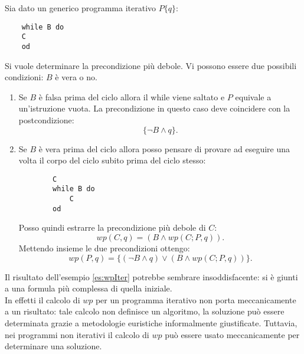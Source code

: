 \begin{es}
	\label{es:wpIter}
	Sia dato un generico programma iterativo $P\{q\}$:
	\begin{lstlisting}
	while B do
	C
	od
	\end{lstlisting}
	Si vuole determinare la precondizione pi\`u debole.
	Vi possono essere due possibili condizioni: $B$ \`e vera o no. 
	\begin{enumerate}
		\item Se $B$ \`e falsa prima del ciclo allora il while viene saltato e $P$ equivale a un'istruzione vuota. La precondizione in questo caso deve coincidere con la postcondizione: $$\{\neg B \land q \}.$$
		\item Se $B$ \`e vera prima del ciclo allora posso pensare di provare ad eseguire una volta il corpo del ciclo subito prima del ciclo stesso:
		\begin{lstlisting}
		C
		while B do
			C
		od
		\end{lstlisting}
		Posso quindi estrarre la precondizione pi\`u debole di $C$: $$wp(C, q) = (B \land wp(C;P,q)).$$
		Mettendo insieme le due precondizioni ottengo: $$wp(P, q)=\{(\neg B \land q )  \lor (B \land wp(C;P,q))\}.$$
	\end{enumerate}
\end{es}
Il risultato dell'esempio \ref{es:wpIter} potrebbe sembrare insoddisfacente: si \`e giunti a una formula pi\`u complessa di quella iniziale. \\
In effetti il calcolo di $wp$ per un programma iterativo non porta meccanicamente a un risultato: tale calcolo non definisce un algoritmo, la soluzione pu\`o essere determinata grazie a metodologie euristiche informalmente giustificate. Tuttavia, nei programmi non iterativi il calcolo di $wp$ pu\`o essere usato meccanicamente per determinare una soluzione.